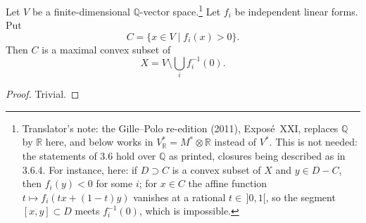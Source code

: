 \begin{lemma}\label{sga3:XXI:3.6.1}
Let \(V\) be a finite-dimensional \(\mathbb Q\)-vector
space.\footnote{Translator's note: the Gille--Polo re-edition (2011), Exposé~XXI, replaces \(\mathbb Q\) by \(\mathbb R\) here, and below
works in \(V^\ast_{\mathbb R}=M^\ast\otimes\mathbb R\) instead of \(V^\ast\). This is not
needed: the statements of 3.6 hold over \(\mathbb Q\) as printed, closures being
described as in 3.6.4. For instance, here: if \(D\supset C\) is a convex subset of \(X\)
and \(y\in D-C\), then \(f_i(y)<0\) for some \(i\); for \(x\in C\) the affine function
\(t\mapsto f_i(tx+(1-t)y)\) vanishes at a rational \(t\in\,]0,1[\), so the segment
\([x,y]\subset D\) meets \(f_i^{-1}(0)\), which is impossible.} Let \(f_i\) be independent linear forms.
Put
\[
 C=\{x\in V\mid f_i(x)>0\}.
\]
Then \(C\) is a maximal convex subset of
\[
 X=V\setminus\bigcup_i f_i^{-1}(0).
\]
\end{lemma}

\begin{proof}
Trivial.
\end{proof}
